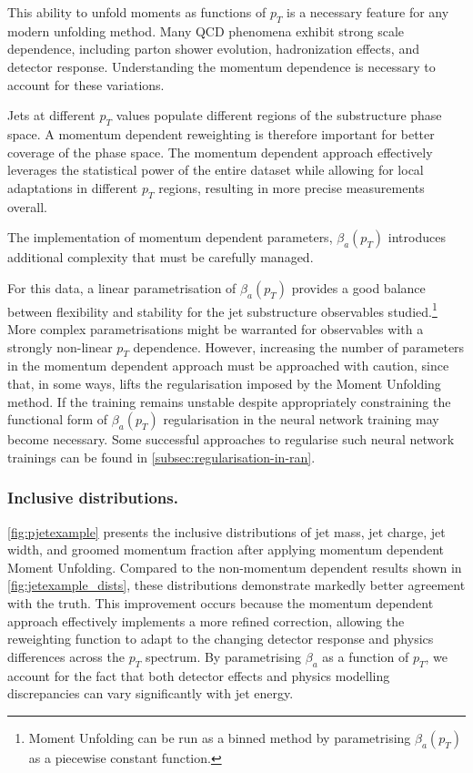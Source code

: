         This ability to unfold moments as functions of \(p_T\) is a necessary feature for any modern unfolding method.
        Many QCD phenomena exhibit strong scale dependence, including parton shower evolution, hadronization effects, and detector response.
        Understanding the momentum dependence is necessary to account for these variations.
        
        Jets at different \(p_T\) values populate different regions of the substructure phase space.
        A momentum dependent reweighting is therefore important for better coverage of the phase space.
        The momentum dependent approach effectively leverages the statistical power of the entire dataset while allowing for local adaptations in different \(p_T\) regions, resulting in more precise measurements overall.

        The implementation of momentum dependent parameters, \(\beta_a(p_T)\) introduces additional complexity that must be carefully managed.
        
        For this data, a linear parametrisation of \(\beta_a(p_T)\) provides a good balance between flexibility and stability for the jet substructure observables studied.\footnote{Moment Unfolding can be run as a binned method by parametrising \(\beta_a(p_T)\) as a piecewise constant function.}
        More complex parametrisations might be warranted for observables with a strongly non-linear \(p_T\) dependence.
        However, increasing the number of parameters in the momentum dependent approach must be approached with caution, since that, in some ways, lifts the regularisation imposed by the Moment Unfolding method.
        If the training remains unstable despite appropriately constraining the functional form of \(\beta_a(p_T)\) regularisation in the neural network training may become necessary.
        Some successful approaches to regularise such neural network trainings can be found in \cref{subsec:regularisation-in-ran}.
        
        \subsubsection{Inclusive distributions.}
            \cref{fig:pjetexample} presents the inclusive distributions of jet mass, jet charge, jet width, and groomed momentum fraction after applying momentum dependent Moment Unfolding.
            Compared to the non-momentum dependent results shown in \cref{fig:jetexample_dists}, these distributions demonstrate markedly better agreement with the truth.
            This improvement occurs because the momentum dependent approach effectively implements a more refined correction, allowing the reweighting function to adapt to the changing detector response and physics differences across the \(p_T\) spectrum.
            By parametrising \(\beta_a\) as a function of \(p_T\), we account for the fact that both detector effects and physics modelling discrepancies can vary significantly with jet energy.

